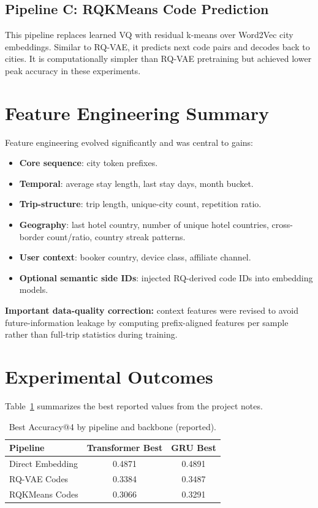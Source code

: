 \documentclass[11pt]{article}
\begin{document}
\subsection{Pipeline C: RQKMeans Code Prediction}
This pipeline replaces learned VQ with residual k-means over Word2Vec city embeddings. Similar to RQ-VAE, it predicts next code pairs and decodes back to cities. It is computationally simpler than RQ-VAE pretraining but achieved lower peak accuracy in these experiments.

\section{Feature Engineering Summary}
Feature engineering evolved significantly and was central to gains:
\begin{itemize}[leftmargin=1.5em]
    \item \textbf{Core sequence}: city token prefixes.
    \item \textbf{Temporal}: average stay length, last stay days, month bucket.
    \item \textbf{Trip-structure}: trip length, unique-city count, repetition ratio.
    \item \textbf{Geography}: last hotel country, number of unique hotel countries, cross-border count/ratio, country streak patterns.
    \item \textbf{User context}: booker country, device class, affiliate channel.
    \item \textbf{Optional semantic side IDs}: injected RQ-derived code IDs into embedding models.
\end{itemize}

\textbf{Important data-quality correction:} context features were revised to avoid future-information leakage by computing prefix-aligned features per sample rather than full-trip statistics during training.

\section{Experimental Outcomes}
Table~\ref{tab:results} summarizes the best reported values from the project notes.

\begin{table}[h]
\centering
\caption{Best Accuracy@4 by pipeline and backbone (reported).}
\label{tab:results}
\begin{tabular}{lcc}
\toprule
\textbf{Pipeline} & \textbf{Transformer Best} & \textbf{GRU Best} \\
\midrule
Direct Embedding & 0.4871 & 0.4891 \\
RQ-VAE Codes & 0.3384 & 0.3487 \\
RQKMeans Codes & 0.3066 & 0.3291 \\
\bottomrule
\end{tabular}
\end{table}
\end{document}
